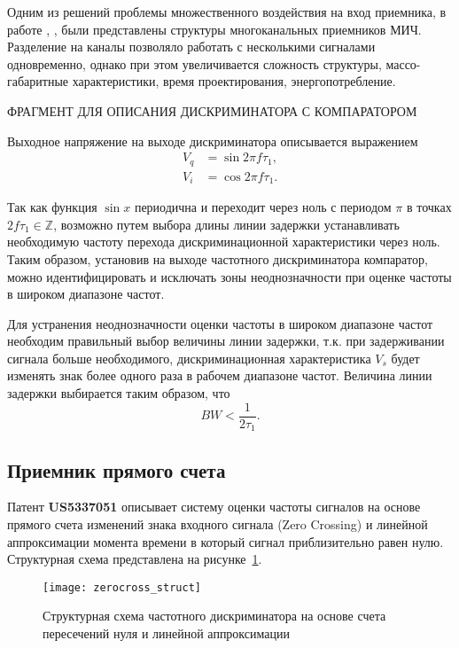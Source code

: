 Одним из решений проблемы множественного воздействия на вход приемника, в работе \cite{Choi2014}, \cite{gruchalla_instantaneous_2006}, были представлены структуры многоканальных приемников МИЧ. Разделение на каналы позволяло работать с несколькими сигналами одновременно, однако при этом увеличивается сложность структуры, массо-габаритные характеристики, время проектирования, энергопотребление.

ФРАГМЕНТ ДЛЯ ОПИСАНИЯ ДИСКРИМИНАТОРА С КОМПАРАТОРОМ

Выходное напряжение на выходе дискриминатора описывается выражением
\begin{equation*}
	\begin{aligned}
		V_{q} &= \sin{2 \pi f \tau_{1}},\\
		V_{i} &= \cos{2 \pi f \tau_{1}}.
	\end{aligned}
\end{equation*}

Так как функция \(\sin{x}\) периодична и переходит через ноль с периодом \(\pi\) в точках \(2 f \tau_{1} \in \mathbb{Z} \), возможно путем выбора длины линии задержки устанавливать необходимую частоту перехода дискриминационной характеристики через ноль. Таким образом, установив на выходе частотного дискриминатора компаратор, можно идентифицировать и исключать зоны неоднозначности при оценке частоты в широком диапазоне частот.

Для устранения неоднозначности оценки частоты в широком диапазоне частот необходим правильный выбор величины линии задержки, т.к. при задерживании сигнала больше необходимого, дискриминационная характеристика \(V_s\) будет изменять знак более одного раза в рабочем диапазоне частот. Величина линии задержки выбирается таким образом, что
\begin{equation*}
	BW < \frac{1}{2 \tau_{1}}.
\end{equation*}



\subsection{Приемник прямого счета}
Патент \textbf{US5337051} описывает систему оценки частоты сигналов на основе прямого счета изменений знака входного сигнала (Zero Crossing) и линейной аппроксимации момента времени в который сигнал приблизительно равен нулю. Структурная схема представлена на рисунке~\ref{ct:zerocross_struct}.
\begin{figure}[ht]
	\centering
	\texttt{[image: zerocross\_struct]}
	
	\caption{Структурная схема частотного дискриминатора на основе счета пересечений нуля и линейной аппроксимации}
	\label{ct:zerocross_struct}
\end{figure}

